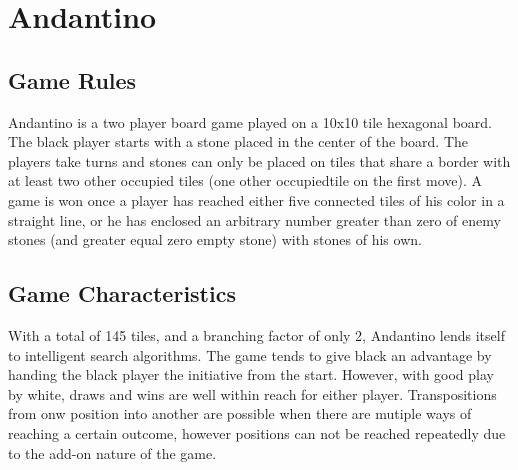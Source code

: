 \section{Andantino}

\subsection{Game Rules}
Andantino is a two player board game played on a 10x10 tile hexagonal board. The black player starts with a stone placed in the center of the board. The players take turns and stones can only be placed on tiles that share a border with at least two other occupied tiles (one other occupiedtile on the first move). A game is won once a player has reached either five connected tiles of his color in a straight line, or he has enclosed an arbitrary number greater than zero of enemy stones (and greater equal zero empty stone) with stones of his own.


\subsection{Game Characteristics}
With a total of 145 tiles, and a branching factor of only 2, Andantino lends itself to intelligent search algorithms. The game tends to give black an advantage by handing the black player the initiative from the start. However, with good play by white, draws and wins are well within reach for either player. Transpositions from onw position into another are possible when there are mutiple ways of reaching a certain outcome, however positions can not be reached repeatedly due to the add-on nature of the game.